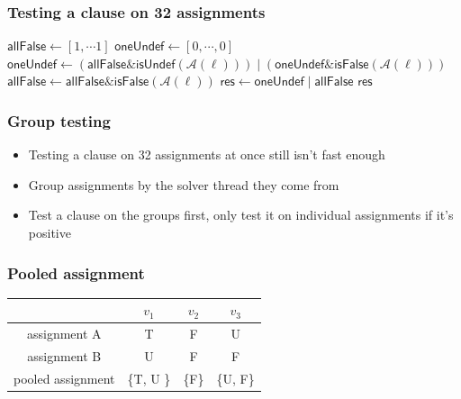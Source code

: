\documentclass{beamer}
\newcommand{\isFalse}{\ensuremath{\mathsf{isFalse}}}
\newcommand{\isUndef}{\ensuremath{\mathsf{isUndef}}}
\begin{document}
\begin{frame}
\frametitle{Testing a clause on 32 assignments}

\begin{algorithm}[H]
\begin{algorithmic}[1]
    \State $\mathsf{allFalse} \gets [1,\cdots 1]$ 
    \State $\mathsf{oneUndef} \gets [0, \cdots, 0]$ 
        \State $\mathsf{oneUndef} \gets (\mathsf{allFalse} \& \isUndef(\bm{\mathcal{A}}(\ell))) \mid  (\mathsf{oneUndef} \& \isFalse(\bm{\mathcal{A}}(\ell)))$
        \State $\mathsf{allFalse} \gets \mathsf{allFalse} \& \isFalse(\bm{\mathcal{A}}(\ell))$
    \EndFor
    \State  $\mathsf{res} \gets \mathsf{oneUndef} \mid  \mathsf{allFalse}$
    \State \Return $\mathsf{res}$
\end{algorithmic}
\end{algorithm}

\end{frame}

\begin{frame}
\frametitle{Group testing}
\begin{itemize}
\item Testing a clause on 32 assignments at once still isn't fast enough
\item Group assignments by the solver thread they come from
\item Test a clause on the groups first, only test it on individual assignments if it's positive
\end{itemize}
\end{frame}

\begin{frame}
\frametitle{Pooled assignment}
\begin{center}
\begin{tabular}{ | c | c | c | c |}
\hline
 & $v_1$ & $v_2$ & $v_3$\\ 
\hline
assignment A & T & F & U \\  
assignment B & U & F & F \\    
\hline
pooled assignment & \{T, U \} & \{F\} & \{U, F\}\\
\hline
\end{tabular}
\end{center}
\end{frame}
\end{document}
